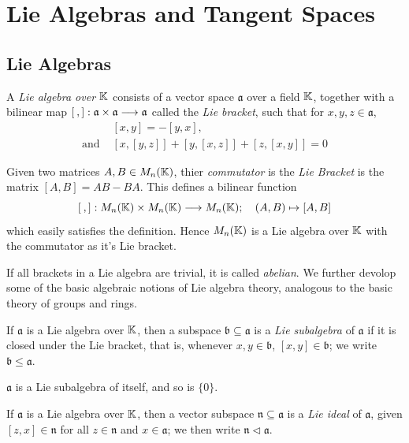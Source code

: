 \chapter{Lie Algebras and Tangent Spaces}

\section{Lie Algebras}

\begin{definition}
  A {\it Lie algebra over \(\mathbb{K}\)} consists of a vector space \(\mathfrak{a}\) over a field
  \(\mathbb{K}\), together with a bilinear map \([\hspace{2px},]:\mathfrak{a}\times\mathfrak{a}\longrightarrow\mathfrak{a}\)
  called the {\it Lie bracket}, such that for \(x,y,z\in\mathfrak{a}\),
  \begin{eqnarray*}
    &[x,y]=-[y,x], \\
    \text{and } &[x,[y,z]]+[y,[x,z]]+[z,[x,y]]=0
  \end{eqnarray*}
\end{definition}

Given two matrices \(A,B\in M_n(\mathbb{K})\), thier {\it commutator} is the {\it Lie Bracket}
is the matrix \([A,B]=AB-BA\). This defines a bilinear function
\[ [\hspace{2px},]:M_n(\K)\times M_n(\K)\longrightarrow M_n(\K);\hspace{10px} (A,B)\mapsto [A,B] \]
which easily satisfies the definition. Hence \(M_n(\mathbb{K})\) is a Lie algebra over \(\mathbb{K}\) with
the commutator as it's Lie bracket.

If all brackets in a Lie algebra are trivial, it is called {\it abelian}.
We further devolop some of the basic algebraic notions of Lie algebra theory, analogous
to the basic theory of groups and rings.

\begin{definition}
  If \(\mathfrak{a}\) is a Lie algebra over \(\mathbb{K}\), then a subspace \(\mathfrak{b}\subseteq\mathfrak{a}\)
  is a {\it Lie subalgebra} of \(\mathfrak{a}\) if it is closed under the Lie bracket, that is,
  whenever \(x,y\in\mathfrak{b}\), \([x,y]\in\mathfrak{b}\); we write \(\mathfrak{b}\le\mathfrak{a}\).
\end{definition}

\(\mathfrak{a}\) is a Lie subalgebra of itself, and so is \(\{0\}\).

\begin{definition}
  If \(\mathfrak{a}\) is a Lie algebra over \(\mathbb{K}\), then a vector subspace \(\mathfrak{n}\subseteq\mathfrak{a}\)
  is a {\it Lie ideal} of \(\mathfrak{a}\), given \([z,x]\in\mathfrak{n}\) for all
  \(z\in\mathfrak{n}\) and \(x\in\mathfrak{a}\); we then write \(\mathfrak{n}\vartriangleleft\mathfrak{a}\).
\end{definition}

